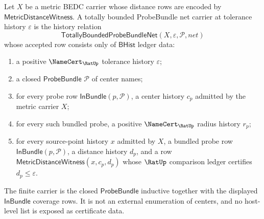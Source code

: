 \begin{definition}
\label{def:totallybounded-probebundle-net-carrier}
Let $X$ be a metric BEDC carrier whose distance rows are encoded by
$\mathsf{MetricDistanceWitness}$. A totally bounded ProbeBundle net carrier
at tolerance history $\varepsilon$ is the history relation
$$
\mathsf{TotallyBoundedProbeBundleNet}(X,\varepsilon,\mathcal{P},net)
$$
whose accepted row consists only of $\mathsf{BHist}$ ledger data:
\begin{enumerate}
  \item a positive $\NameCert_{\RatUp}$ tolerance history $\varepsilon$;
  \item a closed $\mathsf{ProbeBundle}$ $\mathcal{P}$ of center names;
  \item for every probe row $\mathsf{InBundle}(p,\mathcal{P})$, a center
  history $c_p$ admitted by the metric carrier $X$;
  \item for every such bundled probe, a positive $\NameCert_{\RatUp}$ radius
  history $r_p$;
  \item for every source-point history $x$ admitted by $X$, a bundled probe
  row $\mathsf{InBundle}(p,\mathcal{P})$, a distance history $d_p$, and a
  row $\mathsf{MetricDistanceWitness}(x,c_p,d_p)$ whose $\RatUp$ comparison
  ledger certifies $d_p \leq \varepsilon$.
\end{enumerate}
The finite carrier is the closed $\mathsf{ProbeBundle}$ inductive together
with the displayed $\mathsf{InBundle}$ coverage rows. It is not an external
enumeration of centers, and no host-level list is exposed as certificate data.
\end{definition}

